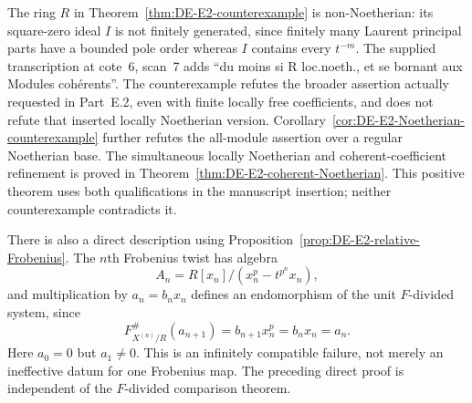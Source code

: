\begin{remark}\label{rem:DE-E2-Noetherian-scope}
The ring $R$ in Theorem~\ref{thm:DE-E2-counterexample} is non-Noetherian: its square-zero ideal $I$ is not finitely generated, since finitely many Laurent principal parts have a bounded pole order whereas $I$ contains every $t^{-m}$.  The supplied transcription at cote~6, scan~7 adds ``du moins si R loc.noeth., et se bornant aux Modules coh\'erents''.  The counterexample refutes the broader assertion actually requested in Part~E.2, even with finite locally free coefficients, and does not refute that inserted locally Noetherian version.  Corollary~\ref{cor:DE-E2-Noetherian-counterexample} further refutes the all-module assertion over a regular Noetherian base.  The simultaneous locally Noetherian and coherent-coefficient refinement is proved in Theorem~\ref{thm:DE-E2-coherent-Noetherian}.  This positive theorem uses both qualifications in the manuscript insertion; neither counterexample contradicts it.

There is also a direct description using Proposition~\ref{prop:DE-E2-relative-Frobenius}.  The $n$th Frobenius twist has algebra
\[
 A_n=R[x_n]/(x_n^p-t^{p^n}x_n),
\]
and multiplication by $a_n=b_nx_n$ defines an endomorphism of the unit $F$-divided system, since
\[
 F_{X^{(n)}/R}^{\#}(a_{n+1})
       =b_{n+1}x_n^p=b_nx_n=a_n.
\]
Here $a_0=0$ but $a_1\ne0$.  This is an infinitely compatible failure, not merely an ineffective datum for one Frobenius map.  The preceding direct proof is independent of the $F$-divided comparison theorem.
\end{remark}
